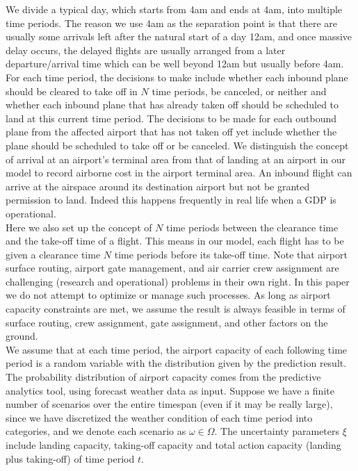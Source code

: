 \documentclass[12pt]{article}
\begin{document}
	We divide a typical day, which starts from 4am and ends at 4am, into multiple time periods. The reason we use 4am as the separation point is that there are usually some arrivals left after the natural start of a day 12am, and once massive delay occurs, the delayed flights are usually arranged from a later departure/arrival time which can be well beyond 12am but usually before 4am. For each time period, the decisions to make include whether each inbound plane should be cleared to take off in \(N\) time periods, be canceled, or neither and whether each inbound plane that has already taken off should be scheduled to land at this current time period. The decisions to be made for each outbound plane from the affected airport that has not taken off yet include whether the plane should be scheduled to take off or be canceled. We distinguish the concept of arrival at an airport's terminal area from that of landing at an airport in our model to record airborne cost in the airport terminal area. An inbound flight can arrive at the airspace around its destination airport but not be granted permission to land.  Indeed this happens frequently in real life when a GDP is operational.\\
	\newline
	Here we also set up the concept of \(N\) time periods between the clearance time and the take-off time of a flight. This means in our model, each flight has to be given a clearance time \(N\) time periods before its take-off time. Note that airport surface routing, airport gate management, and air carrier crew assignment are challenging (research and operational) problems in their own right. In this paper we do not attempt to optimize or manage such processes. As long as airport capacity constraints are met, we assume the result is always feasible in terms of surface routing, crew assignment, gate assignment, and other factors on the ground.\\
	\newline %
	We assume that at each time period, the airport capacity of each following time period is a random variable with the distribution given by the prediction result. The probability distribution of airport capacity comes from the predictive analytics tool, using forecast weather data as input. Suppose we have a finite number of scenarios over the entire timespan (even if it may be really large), since we have discretized the weather condition of each time period into categories, and we denote each scenario as \(\omega \in \Omega\). The uncertainty parameters \(\xi\) include landing capacity, taking-off capacity and total action capacity (landing plus taking-off) of time period \(t\).\\
\end{document}
